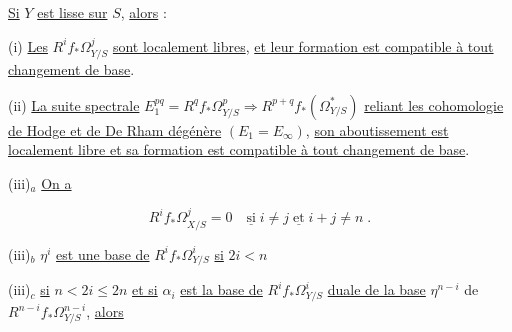 \begin{center}
\end{center}
\underline{Si} $Y$ \underline{est lisse sur} $S$, \underline{alors} :

(i) \underline{Les} $R^i f_* \Omega^j_{Y/S}$ \underline{sont localement libres}, \underline{et leur formation est compatible à tout changement de base}.

(ii) \underline{La suite spectrale} $E_1^{pq} = R^q f_* \Omega^p_{Y/S} \Longrightarrow R^{p+q} f_*(\Omega^*_{Y/S})$ \underline{reliant les cohomologie de Hodge et de De Rham dégénère} $(E_1 = E_\infty)$, \underline{son aboutissement est localement libre et sa formation est compatible à tout changement de base}.

(iii)$_a$ \underline{On a}

\begin{equation*}
R^i f_* \Omega^j_{X/S} = 0 \quad \underline{\mbox{si}} \; i \neq j \; \underline{\mbox{et}} \; i+j \neq n \; .
\end{equation*}


(iii)$_b$ $\eta^i$ \underline{est une base de} $R^i f_* \Omega^i_{Y/S}$ \underline{si} $2i < n$

(iii)$_c$ \underline{si} $n<2i\leq 2n$ \underline{et si} $\alpha_i$ \underline{est la base de} $R^i f_* \Omega^i_{Y/S}$ \underline{duale de la base} $\eta^{n-i}$ de $R^{n-i} f_* \Omega^{n-i}_{Y/S}$, \underline{alors}

